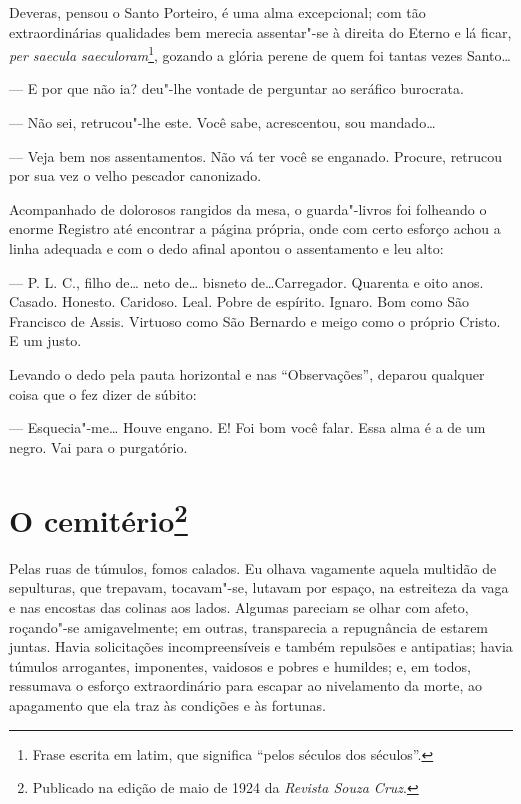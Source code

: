 Deveras, pensou o Santo Porteiro, é uma alma excepcional; com tão
extraordinárias qualidades bem merecia assentar"-se à direita do Eterno e
lá ficar, \emph{per saecula saeculoram}\footnote{Frase escrita em latim,
  que significa ``pelos séculos dos séculos''.}, gozando a glória perene
de quem foi tantas vezes Santo\ldots{}

--- E por que não ia? deu"-lhe vontade de perguntar ao seráfico burocrata.

--- Não sei, retrucou"-lhe este. Você sabe, acrescentou, sou mandado\ldots{}

--- Veja bem nos assentamentos. Não vá ter você se enganado. Procure,
retrucou por sua vez o velho pescador canonizado.

Acompanhado de dolorosos rangidos da mesa, o guarda"-livros foi folheando
o enorme Registro até encontrar a página própria, onde com certo esforço
achou a linha adequada e com o dedo afinal apontou o assentamento e leu
alto:

--- P. L. C., filho de\ldots{} neto de\ldots{} bisneto de\ldots{}Carregador. Quarenta e
oito anos. Casado. Honesto. Caridoso. Leal. Pobre de espírito. Ignaro.
Bom como São Francisco de Assis. Virtuoso como São Bernardo e meigo como
o próprio Cristo. E um justo.

Levando o dedo pela pauta horizontal e nas ``Observações'', deparou
qualquer coisa que o fez dizer de súbito:

--- Esquecia"-me\ldots{} Houve engano. E! Foi bom você falar. Essa alma é a de
um negro. Vai para o purgatório.



\chapter[O cemitério]{O cemitério\footnote[*]{Publicado na edição de maio de 1924 da \emph{Revista Souza Cruz}.}}

Pelas ruas de túmulos, fomos calados. Eu olhava vagamente aquela
multidão de sepulturas, que trepavam, tocavam"-se, lutavam por espaço, na
estreiteza da vaga e nas encostas das colinas aos lados. Algumas
pareciam se olhar com afeto, roçando"-se amigavelmente; em outras,
transparecia a repugnância de estarem juntas. Havia solicitações
incompreensíveis e também repulsões e antipatias; havia túmulos
arrogantes, imponentes, vaidosos e pobres e humildes; e, em todos,
ressumava o esforço extraordinário para escapar ao nivelamento da morte,
ao apagamento que ela traz às condições e às fortunas.

